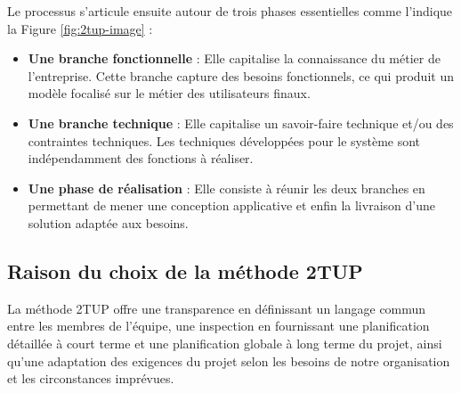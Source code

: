 \newpage

\noindent Le processus s'articule ensuite autour de trois phases essentielles comme l'indique la Figure \ref{fig:2tup-image} :
\begin{itemize}[itemsep=2pt, parsep=2pt]
    \item \textbf{Une branche fonctionnelle} : Elle capitalise la connaissance du métier de l’entreprise. Cette branche capture des besoins fonctionnels, ce qui produit un modèle focalisé sur le métier des utilisateurs finaux.
    \item \textbf{Une branche technique} : Elle capitalise un savoir-faire technique et/ou des contraintes techniques. Les techniques développées pour le système sont indépendamment des fonctions à réaliser.
    \item \textbf{Une phase de réalisation} : Elle consiste à réunir les deux branches en permettant de mener une conception applicative et enfin la livraison d'une solution adaptée aux besoins.
\end{itemize}

\subsection{Raison du choix de la méthode 2TUP}
La méthode 2TUP offre une transparence en définissant un langage commun entre les membres de l'équipe, une inspection en fournissant une planification détaillée à court terme et une planification globale à long terme du projet, ainsi qu'une adaptation des exigences du projet selon les besoins de notre organisation et les circonstances imprévues.

